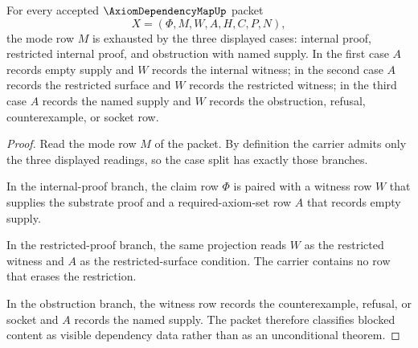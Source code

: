 \begin{theorem}
\label{thm:axiom-dependency-map-mode-soundness}
For every accepted $\AxiomDependencyMapUp$ packet
$$
X=(\Phi,M,W,A,H,C,P,N),
$$
the mode row $M$ is exhausted by the three displayed cases: internal proof, restricted internal proof, and obstruction with named supply. In the first case $A$ records empty supply and $W$ records the internal witness; in the second case $A$ records the restricted surface and $W$ records the restricted witness; in the third case $A$ records the named supply and $W$ records the obstruction, refusal, counterexample, or socket row.
\end{theorem}
\begin{proof}
Read the mode row $M$ of the packet. By definition the carrier admits only the three displayed readings, so the case split has exactly those branches.

In the internal-proof branch, the claim row $\Phi$ is paired with a witness row $W$ that supplies the substrate proof and a required-axiom-set row $A$ that records empty supply.

In the restricted-proof branch, the same projection reads $W$ as the restricted witness and $A$ as the restricted-surface condition. The carrier contains no row that erases the restriction.

In the obstruction branch, the witness row records the counterexample, refusal, or socket and $A$ records the named supply. The packet therefore classifies blocked content as visible dependency data rather than as an unconditional theorem.
\end{proof}

